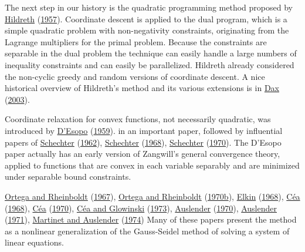 \documentclass[
  12pt,
]{book}
\begin{document}
The next step in our history is the quadratic programming method proposed by \protect\hyperlink{ref-hildreth_57}{Hildreth} (\protect\hyperlink{ref-hildreth_57}{1957}). Coordinate descent is applied to the dual program, which is a simple quadratic problem with non-negativity constraints, originating from the Lagrange multipliers for the primal problem. Because the constraints are separable in the dual problem the technique can easily handle a large numbers of inequality constraints and can easily be parallelized. Hildreth already considered the non-cyclic greedy and random versions of coordinate descent. A nice historical overview of Hildreth's method and its various extensions is in \protect\hyperlink{ref-dax_03}{Dax} (\protect\hyperlink{ref-dax_03}{2003}).

Coordinate relaxation for convex functions, not necessarily quadratic, was introduced by \protect\hyperlink{ref-desopo_59}{D'Esopo} (\protect\hyperlink{ref-desopo_59}{1959}).
in an important paper, followed by influential papers of \protect\hyperlink{ref-schechter_62}{Schechter} (\protect\hyperlink{ref-schechter_62}{1962}), \protect\hyperlink{ref-schechter_68}{Schechter} (\protect\hyperlink{ref-schechter_68}{1968}), \protect\hyperlink{ref-schechter_70}{Schechter} (\protect\hyperlink{ref-schechter_70}{1970}). The D'Esopo paper actually has an early version of Zangwill's general convergence theory, applied to functions that are convex in each variable separably and are minimized under separable bound constraints.

\protect\hyperlink{ref-ortega_rheinboldt_67}{Ortega and Rheinboldt} (\protect\hyperlink{ref-ortega_rheinboldt_67}{1967}), \protect\hyperlink{ref-ortega_rheinboldt_70a}{Ortega and Rheinboldt} (\protect\hyperlink{ref-ortega_rheinboldt_70a}{1970b}), \protect\hyperlink{ref-elkin_68}{Elkin} (\protect\hyperlink{ref-elkin_68}{1968}), \protect\hyperlink{ref-cea_68}{Céa} (\protect\hyperlink{ref-cea_68}{1968}), \protect\hyperlink{ref-cea_70}{Céa} (\protect\hyperlink{ref-cea_70}{1970}), \protect\hyperlink{ref-cea_glowinski_73}{Céa and Glowinski} (\protect\hyperlink{ref-cea_glowinski_73}{1973}), \protect\hyperlink{ref-auslender_70}{Auslender} (\protect\hyperlink{ref-auslender_70}{1970}), \protect\hyperlink{ref-auslender_71}{Auslender} (\protect\hyperlink{ref-auslender_71}{1971}), \protect\hyperlink{ref-martinet_auslender_74}{Martinet and Auslender} (\protect\hyperlink{ref-martinet_auslender_74}{1974})
Many of these papers present the method as a nonlinear generalization of the Gauss-Seidel method of solving a system of linear
equations.
\end{document}
